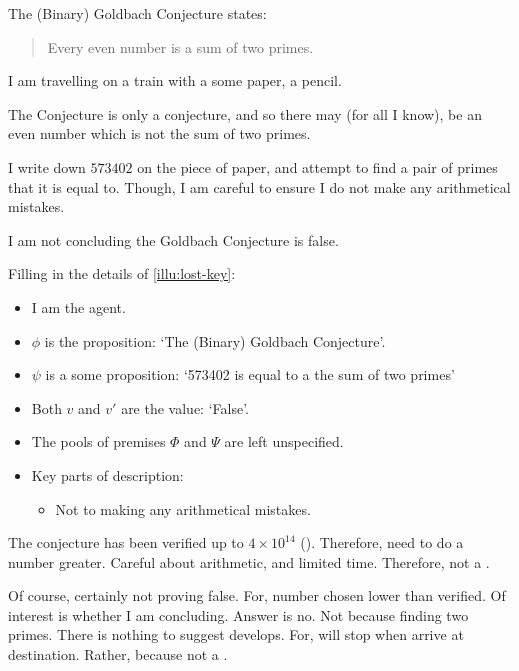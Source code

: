 \begin{note}
  \begin{illustration}
    The (Binary) Goldbach Conjecture states:

    \begin{quote}
      Every even number is a sum of two primes.
    \end{quote}

    I am travelling on a train with a some paper, a pencil.

    The Conjecture is only a conjecture, and so there may (for all I know), be an even number which is not the sum of two primes.

    I write down \(573402\) on the piece of paper, and attempt to find a pair of primes that it is equal to.
    Though, I am careful to ensure I do not make any arithmetical mistakes.

    I am not concluding the Goldbach Conjecture is false.
  \end{illustration}

  Filling in the details of \autoref{illu:lost-key}:

  \begin{itemize}[noitemsep]
  \item
    I am the agent.
  \item
    \(\phi\) is the proposition: `The (Binary) Goldbach Conjecture'.
  \item
    \(\psi\) is a some proposition: `573402 is equal to a the sum of two primes'
  \item
    Both \(v\) and \(v'\) are the value: `False'.
  \item
    The pools of premises \(\Phi\) and \(\Psi\) are left unspecified.
  \item
    Key parts of description:
    \begin{itemize}
    \item
      Not to making any arithmetical mistakes.
    \end{itemize}
  \end{itemize}

  The conjecture has been verified up to \(4 \times 10^{14}\) (\cite[cf.][]{Richstein:2001aa}).
  Therefore, need to do a number greater.
  Careful about arithmetic, and limited time.
  Therefore, not a .

  Of course, certainly not proving false.
  For, number chosen lower than verified.
  Of interest is whether I am concluding.
  Answer is no.
  Not because finding two primes.
  There is nothing to suggest develops.
  For, will stop when arrive at destination.
  Rather, because not a .
\end{note}

